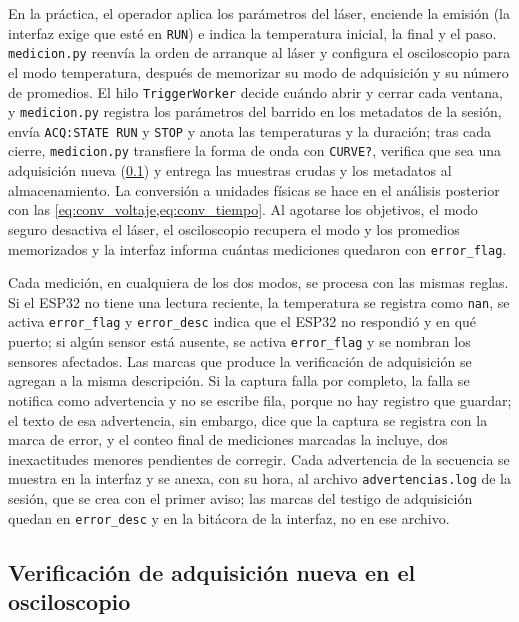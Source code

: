 En la práctica, el operador aplica los parámetros del láser, enciende
la emisión (la interfaz exige que esté en \texttt{RUN}) e indica la
temperatura inicial, la final y el paso. \texttt{medicion.py} reenvía la
orden de arranque al láser y configura el osciloscopio para el modo
temperatura, después de memorizar su modo de adquisición y su número de
promedios. El hilo \texttt{TriggerWorker} decide cuándo abrir y cerrar
cada ventana, y \texttt{medicion.py} registra los parámetros del
barrido en los metadatos de la sesión, envía \texttt{ACQ:STATE RUN} y
\texttt{STOP} y anota las temperaturas y la duración; tras cada cierre, \texttt{medicion.py} transfiere la forma de
onda con \texttt{CURVE?}, verifica que sea una adquisición nueva
(\cref{sec:verificacion_adquisicion}) y entrega las muestras crudas y
los metadatos al almacenamiento. La conversión a unidades físicas se
hace en el análisis posterior con las
\cref{eq:conv_voltaje,eq:conv_tiempo}. Al agotarse los objetivos, el
modo seguro desactiva el láser, el osciloscopio recupera el modo y los
promedios memorizados y la interfaz informa cuántas mediciones quedaron
con \texttt{error\_flag}.

Cada medición, en cualquiera de los dos modos, se procesa con las
mismas reglas. Si el ESP32 no tiene una lectura reciente, la
temperatura se registra como \texttt{nan}, se activa
\texttt{error\_flag} y \texttt{error\_desc} indica que el ESP32 no
respondió y en qué puerto; si algún sensor está ausente, se activa
\texttt{error\_flag} y se nombran los sensores afectados. Las marcas
que produce la verificación de adquisición se agregan a la misma
descripción. Si la captura falla por completo, la falla se notifica
como advertencia y no se escribe fila, porque no hay registro que
guardar; el texto de esa advertencia, sin embargo, dice que la captura
se registra con la marca de error, y el conteo final de mediciones
marcadas la incluye, dos inexactitudes menores pendientes de corregir.
Cada advertencia de la secuencia se muestra en la interfaz y se anexa,
con su hora, al archivo \texttt{advertencias.log} de la sesión, que se
crea con el primer aviso; las marcas del testigo de adquisición quedan
en \texttt{error\_desc} y en la bitácora de la interfaz, no en ese
archivo.

\subsection{Verificación de adquisición nueva en el osciloscopio}
\label{sec:verificacion_adquisicion}

